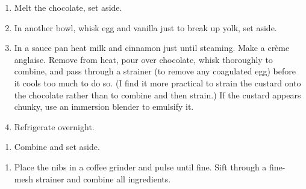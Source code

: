\begin{recipe}
  \begin{enumerate}

  \item Melt the chocolate, set aside.

  \item In another bowl, whisk egg and vanilla just to break up yolk, set aside.

  \item In a sauce pan heat milk and cinnamon just until steaming.
    Make a crème anglaise.  Remove from heat, pour over chocolate,
    whisk thoroughly to combine, and pass through a strainer (to
    remove any coagulated egg) before it cools too much to do so.  (I
    find it more practical to strain the custard onto the chocolate
    rather than to combine and then strain.)  If the custard appears
    chunky, use an immersion blender to emulsify it.

  \item Refrigerate overnight.

  \end{enumerate}
\end{recipe}



\begin{ingredients}
\end{ingredients}

\begin{recipe}
  \begin{enumerate}

  \item Combine and set aside.

  \end{enumerate}
\end{recipe}



\begin{ingredients}
\end{ingredients}

\begin{recipe}
  \begin{enumerate}

  \item Place the nibs in a coffee grinder and pulse until fine.  Sift
    through a fine-mesh strainer and combine all ingredients.

  \end{enumerate}
\end{recipe}

